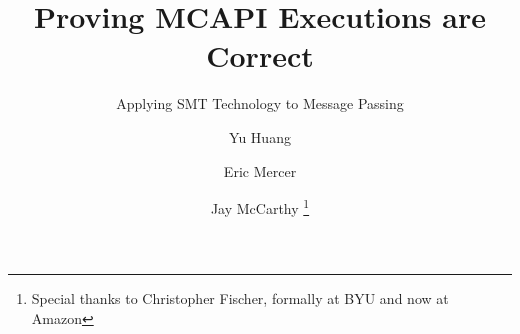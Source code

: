 \documentclass{llncs}
\begin{document}
%
\pagestyle{headings}  %
%
\title{Proving MCAPI Executions are Correct}
\subtitle{Applying SMT Technology to Message Passing}

\author{Yu Huang \and Eric Mercer \and Jay McCarthy \thanks{Special thanks to Christopher Fischer, formally at BYU and now at Amazon}}

\maketitle



%
%
\begin{abstract}

\end{abstract}
%












\end{document}
